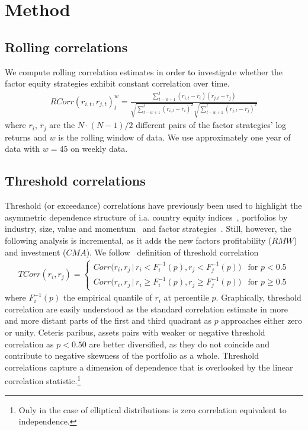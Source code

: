 \section{Method}
\subsection{Rolling correlations}
We compute rolling correlation estimates in order to investigate whether the factor equity strategies exhibit constant correlation over time. 
\begin{align}
    RCorr(r_{i, t}, r_{j, t})_t^{w} = \frac{\sum^{t}_{t-w+1}(r_{i, t} - \bar{r}_i)(r_{j,t} - \bar{r}_j)}{\sqrt{\sum^{t}_{t-w+1} (r_{i,t} - \bar{r}_i)^2} \sqrt{\sum^{t}_{t-w+1} (r_{j,t} - \bar{r}_j)^2}}
\end{align}
where $r_i$, $r_j$ are the $N \cdot (N-1) / 2$ different pairs of the factor strategies' log returns and $w$ is the rolling window of data. We use approximately one year of data with $w = 45$ on weekly data.
\subsection{Threshold correlations}
Threshold (or exceedance) correlations have previously been used to highlight the asymmetric dependence structure of i.a. country equity indices~\autocite{LonginSolnik2001}, portfolios by industry, size, value and momentum~\autocite{AngChen2002} and factor strategies~\autocite{ChristoffersenLanglois2013}. Still, however, the following analysis is incremental, as it adds the new factors profitability ($RMW$) and investment ($CMA$). We follow~\textcite{ChristoffersenLanglois2013} definition of threshold correlation
\begin{align}
    TCorr(r_i, r_j) = 
    \begin{cases} 
        Corr\Big(r_i, r_j \,|\, r_i < F_i^{-1}(p), r_j < F_j^{-1}(p)\Big)  & \text{for } p < 0.5 \\
        Corr\Big(r_i, r_j \,|\, r_i \geq F_i^{-1}(p), r_j \geq F_j^{-1}(p)\Big)  & \text{for } p \geq 0.5
    \end{cases}
\end{align}
where $F_i^{-1}(p)$ the empirical quantile of $r_i$ at percentile $p$. Graphically, threshold correlation are easily understood as the standard correlation estimate in more and more distant parts of the first and third quadrant as $p$ approaches either zero or unity. Ceteris paribus, assets pairs with weaker or negative threshold correlation as $p < 0.50$ are better diversified, as they do not coincide and contribute to negative skewness of the portfolio as a whole. Threshold correlations capture a dimension of dependence that is overlooked by the linear correlation statistic.\footnote{Only in the case of elliptical distributions is zero correlation equivalent to independence.} 
